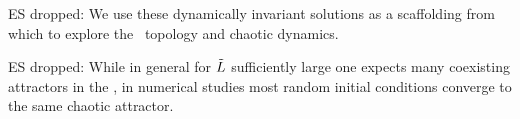 ES{ dropped: We use these dynamically invariant solutions
as a scaffolding from which to explore the
\statesp\  topology and chaotic dynamics.
}%

ES{ dropped:  While in general
for $\tilde{L}$ sufficiently large
one expects many
coexisting attractors in the \statesp%
,
in numerical studies most random initial
conditions converge to the same chaotic attractor.
}%




%

